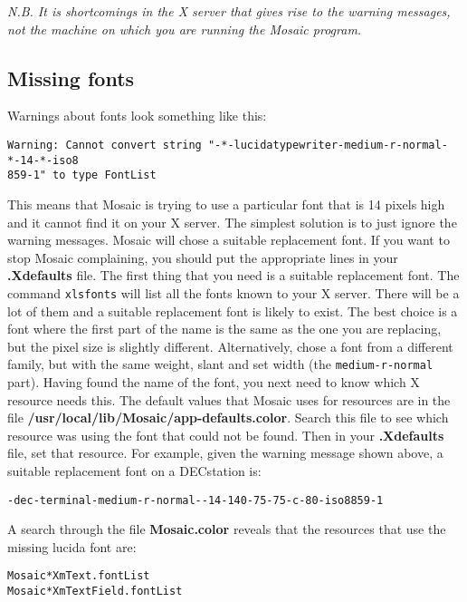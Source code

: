 {\em N.B. It is shortcomings in the X server that gives rise to the warning
messages, not the machine on which you are running the Mosaic program.}

\subsection{Missing fonts}

Warnings about fonts look something like this:

\begin{verbatim}
Warning: Cannot convert string "-*-lucidatypewriter-medium-r-normal-*-14-*-iso8
859-1" to type FontList
\end{verbatim}

This means that Mosaic is trying to use a particular font that is 14 pixels
high and it cannot find it on your X server. The simplest solution is to just
ignore the warning messages. Mosaic will chose a suitable replacement font. If
you want to stop Mosaic complaining, you should put the appropriate lines in
your {\bf .Xdefaults} file. The first thing that you need is a suitable
replacement font. The command {\tt xlsfonts} will list all the fonts known to
your X server. There will be a lot of them and a suitable replacement font is
likely to exist. The best choice is a font where the first part of the name is
the same as the one you are replacing, but the pixel size is slightly
different. Alternatively, chose a font from a different family, but with the
same weight, slant and set width (the {\tt medium-r-normal} part).  Having
found the name of the font, you next need to know which X resource needs this.
The default values that Mosaic uses for resources are in the file {\bf
/usr/local/lib/Mosaic/app-defaults.color}. Search this file to see which
resource was using the font that could not be found. Then in your {\bf
.Xdefaults} file, set that resource. For example, given the warning message
shown above, a suitable replacement font on a DECstation is:

\begin{verbatim}
-dec-terminal-medium-r-normal--14-140-75-75-c-80-iso8859-1
\end{verbatim}

A search through the file {\bf Mosaic.color} reveals that the resources that
use the missing lucida font are:

\begin{verbatim}
Mosaic*XmText.fontList
Mosaic*XmTextField.fontList
\end{verbatim}

